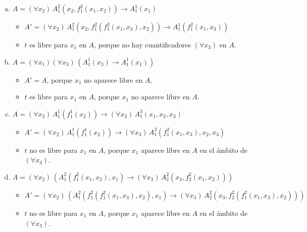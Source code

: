 \begin{enumerate}[(a)]
    \item $A = (\forall x_2) \, A_1^2(x_2, f_1^2(x_1, x_2)) \to A_1^1(x_1)$
    \begin{solution}
    \leavevmode
    \begin{itemize}
        \item $A' = (\forall x_2) \, A_1^2(x_2, f_1^2(f_1^2(x_1, x_3), x_2)) \to A_1^1(f_1^2(x_1, x_3))$
        \item $t$ es libre para $x_1$ en $A$, porque no hay cuantificadores $(\forall x_3)$ en $A$.
    \end{itemize}
    \end{solution}
    
    \item $A = (\forall x_1) (\forall x_3) \, (A_1^1(x_3) \to A_1^1(x_1))$
    \begin{solution}
    \leavevmode
    \begin{itemize}
        \item $A' = A$, porque $x_1$ no aparece libre en $A$.
        \item $t$ es libre para $x_1$ en $A$, porque $x_1$ no aparece libre en $A$.
    \end{itemize}
    \end{solution}
    
    \item $A = (\forall x_2) \, A_1^1(f_1^1(x_2)) \to (\forall x_3) \, A_1^3(x_1, x_2, x_3)$
    \begin{solution}
    \leavevmode
    \begin{itemize}
        \item $A' = (\forall x_2) \, A_1^1(f_1^1(x_2)) \to (\forall x_3) \, A_1^3(f_1^2(x_1, x_3), x_2, x_3)$
        \item $t$ no es libre para $x_1$ en $A$, porque $x_1$ aparece libre en $A$ en el ámbito de $(\forall x_3)$.
    \end{itemize}
    \end{solution}
    
    \item $A = (\forall x_2) \, (A_1^2(f_1^2(x_1, x_2), x_1) \to (\forall x_3) \, A_2^2(x_3, f_2^2(x_1, x_2)))$
    \begin{solution}
    \leavevmode
    \begin{itemize}
        \item $A' = (\forall x_2) \, (A_1^2(f_1^2(f_1^2(x_1, x_3), x_2), x_1) \to (\forall x_3) \, A_2^2(x_3, f_2^2(f_1^2(x_1, x_3), x_2)))$
        \item $t$ no es libre para $x_1$ en $A$, porque $x_1$ aparece libre en $A$ en el ámbito de $(\forall x_3)$.
    \end{itemize}
    \end{solution}
\end{enumerate}
